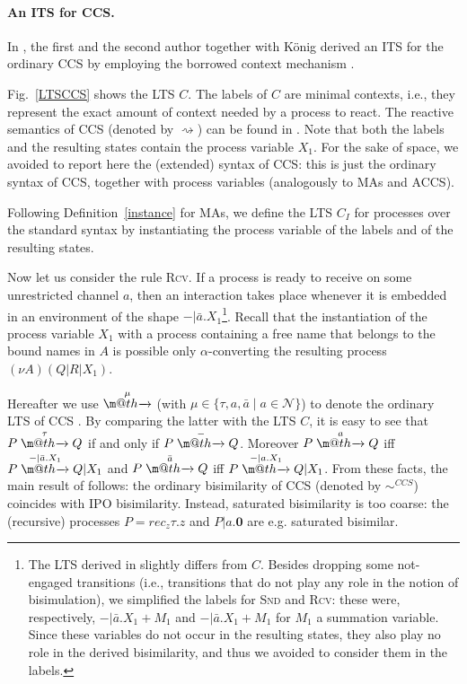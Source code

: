 \documentclass[copyright,creativecommons]{eptcs}
\makeatletter
\newcommand{\nil}{\mathbf{0}}
\def\tr#1{\stackrel{#1}{\to}}
\let\oldrightarrow\to
\renewcommand{\to}[1][]{\ifthenelse{\equal{#1}{}}{\oldrightarrow}{\ensuremath{\xrightarrow{{}_{#1}}}}}
\def \rightarrowfill{\m@th\mathord{\smash-}\mkern-6mu\cleaders\hbox{$\mkern-2mu\mathord{\smash-}\mkern-2mu$}\hfill
  \mkern-6mu\mathord\rightarrow}
\def\tr#1{\stackrel{#1}{\rightarrowfill}}
\newcommand{\react}{\rightsquigarrow}
\newcommand{\<}{\langle}
\renewcommand{\>}{\rangle}
\def\tr#1{\stackrel{#1}{\rightarrowfill}}
\def \rightarrowfill{\m@th\mathord{\smash-}\mkern-6mu\cleaders\hbox{$\mkern-2mu\mathord{\smash-}\mkern-2mu$}\hfill
  \mkern-6mu\mathord\rightarrow}
\makeatother
\begin{document}
\paragraph{An ITS for CCS.}
In \cite{bgk:bisimulation-graph-enc}, the first and the second
author together with K\"onig derived an ITS for the
ordinary CCS by employing the borrowed context mechanism
\cite{EK:06}.

Fig.~\ref{LTSCCS} shows the LTS $C$. The labels of
$C$ are minimal contexts, i.e., they represent the exact
amount of context needed by a process to react. The reactive
semantics of CCS (denoted by $\react$) can be found in
\cite{Mil:PPCA}. Note that both the labels and the resulting states
contain the process variable $X_1$. For the sake of space, we avoided to
report here the (extended) syntax of CCS: this is just the ordinary
syntax of CCS, together with process variables
(analogously to MAs and ACCS).

Following Definition~\ref{instance} for MAs, we define the LTS $C_I$ for processes
over the standard syntax by instantiating the process variable
of the labels and of the resulting states.

Now let us consider the rule \textsc{Rcv}. If a process is ready
to receive on some unrestricted channel $a$, then an interaction
takes place whenever it is embedded in an environment of the shape
$-|\bar{a}.X_1$\footnote{The LTS derived in
\cite{bgk:bisimulation-graph-enc} slightly differs from
$C$. Besides dropping some not-engaged transitions (i.e.,
transitions that do not play any role in the notion of
bisimulation), we simplified the labels for \textsc{Snd} and \textsc{Rcv}:
these were, respectively, $-|\bar{a}.X_1 + M_1$ and $-|\bar{a}.X_1+M_1$ for
$M_1$ a summation variable. Since these variables do not occur in
the resulting states, they also play no role in the derived bisimilarity, and thus
we avoided to consider them in the labels.}. Recall that
the instantiation of the process variable $X_1$ with a process
containing a free name that belongs to the bound names in $A$ is
possible only $\alpha$-converting the resulting process $(\nu
A)(Q|R|X_1)$.

Hereafter we use $\tr{\mu}$ (with $\mu \in \{\tau,a, \bar{a}\; |\;
a\in \mathcal N\}$) to denote the ordinary LTS of CCS
\cite{MIL:CAC}. By comparing the latter with the LTS $C$, it
is easy to see that $P\tr{\tau}Q$ if and only if $P\tr{-}Q$.
Moreover $P\tr{a}Q$ iff $P \tr{-|\bar{a}.X_1} Q|X_1$ and
$P\tr{\bar{a}}Q$ iff $P \tr{-|a.X_1} Q|X_1$. From these
facts, the main result of \cite{bgk:bisimulation-graph-enc}
follows: the ordinary bisimilarity of CCS (denoted by $\sim^{CCS}$)
coincides with IPO bisimilarity. Instead, saturated bisimilarity is
too coarse: the (recursive) processes
$P= rec_z\tau. z$ and $P | a.\nil$ are e.g. saturated bisimilar.
\end{document}
